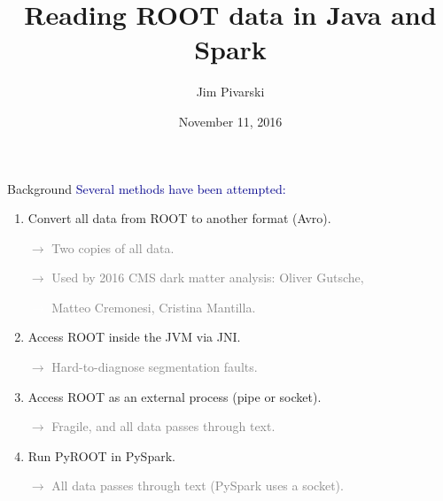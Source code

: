 \documentclass{beamer}
\title[2016-11-10-lucaetal-root4j]{Reading ROOT data in Java and Spark}
\author{Jim Pivarski}
\institute{Princeton -- DIANA}
\date{November 11, 2016}
\begin{document}

\begin{frame}
  \titlepage
\end{frame}



\begin{frame}{Background}
\textcolor{darkblue}{Several methods have been attempted:}

\begin{enumerate}
\item Convert all data from ROOT to another format (Avro).

\textcolor{gray}{$\rightarrow$ Two copies of all data.}

\textcolor{gray}{$\rightarrow$} \textcolor{gray}{Used by 2016 CMS dark matter analysis: Oliver Gutsche,}

\textcolor{white}{$\rightarrow$} \textcolor{gray}{Matteo Cremonesi, Cristina Mantilla.}

\item<2-> Access ROOT inside the JVM via JNI.

\textcolor{gray}{$\rightarrow$ Hard-to-diagnose segmentation faults.}

\item<3-> Access ROOT as an external process (pipe or socket).

\textcolor{gray}{$\rightarrow$ Fragile, and all data passes through text.}

\item<4-> Run PyROOT in PySpark.

\textcolor{gray}{$\rightarrow$ All data passes through text (PySpark uses a socket).}

\end{enumerate}
\end{frame}
\end{document}
